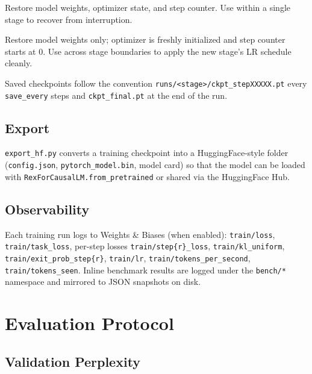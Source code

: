 \documentclass[11pt,a4paper]{article}
\begin{document}
\begin{description}[leftmargin=*]
\item[\texttt{--resume PATH}] Restore model weights, optimizer state, and
step counter. Use within a single stage to recover from interruption.
\item[\texttt{--init-from PATH}] Restore model weights only; optimizer is
freshly initialized and step counter starts at 0. Use across stage
boundaries to apply the new stage's LR schedule cleanly.
\end{description}

Saved checkpoints follow the convention
\texttt{runs/<stage>/ckpt\_stepXXXXX.pt} every \texttt{save\_every} steps
and \texttt{ckpt\_final.pt} at the end of the run.

\subsection{Export}

\texttt{export\_hf.py} converts a training checkpoint into a HuggingFace-style
folder (\texttt{config.json}, \texttt{pytorch\_model.bin}, model card) so
that the model can be loaded with \texttt{RexForCausalLM.from\_pretrained}
or shared via the HuggingFace Hub.

\subsection{Observability}

Each training run logs to Weights \& Biases (when enabled):
\texttt{train/loss}, \texttt{train/task\_loss}, per-step losses
\texttt{train/step\{r\}\_loss}, \texttt{train/kl\_uniform},
\texttt{train/exit\_prob\_step\{r\}}, \texttt{train/lr},
\texttt{train/tokens\_per\_second}, \texttt{train/tokens\_seen}. Inline
benchmark results are logged under the \texttt{bench/*} namespace and
mirrored to JSON snapshots on disk.

\section{Evaluation Protocol}

\subsection{Validation Perplexity}
\end{document}
